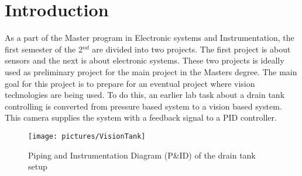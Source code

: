 \setcounter{secnumdepth}{0}
\chapter{Introduction}
\setcounter{secnumdepth}{5}

As a part of the Master program in Electronic systems and Instrumentation, the first semester of the 2$^{nd}$ are divided into two projects. The first project is about sensors and the next is about electronic systems. These two projects is ideally used as preliminary project for the main project in the Masters degree. The main goal for this project is to prepare for an eventual project where vision technologies are being used. To do this, an earlier lab task about a drain tank controlling is converted from pressure based system to a vision based system. This camera supplies the system with a feedback signal to a PID controller.

\begin{figure}[b]
	\centering
	\texttt{[image: pictures/VisionTank]}
	\caption{Piping and Instrumentation Diagram (P\&ID) of the drain tank setup}
	\label{img:ERM_08}
\end{figure}